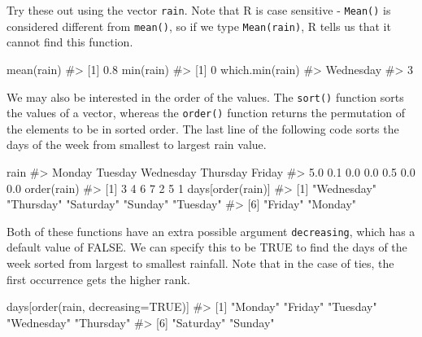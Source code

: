 \documentclass[
  letterpaper,
]{latex/krantz}
\makeatletter
\newenvironment{Shaded}{\begin{snugshade}}{\end{snugshade}}
\newcommand{\AttributeTok}[1]{\textcolor[rgb]{0.40,0.45,0.13}{#1}}
\newcommand{\CommentTok}[1]{\textcolor[rgb]{0.37,0.37,0.37}{#1}}
\newcommand{\ConstantTok}[1]{\textcolor[rgb]{0.56,0.35,0.01}{#1}}
\newcommand{\FunctionTok}[1]{\textcolor[rgb]{0.28,0.35,0.67}{#1}}
\newcommand{\NormalTok}[1]{\textcolor[rgb]{0.00,0.23,0.31}{#1}}
\newenvironment{kframe}{%
\medskip{}
\setlength{\fboxsep}{.8em}
 \def\at@end@of@kframe{}%
 \ifinner\ifhmode%
  \def\at@end@of@kframe{\end{minipage}}%
  \begin{minipage}{\columnwidth}%
 \fi\fi%
 \def\FrameCommand##1{\hskip\@totalleftmargin \hskip-\fboxsep
 \colorbox{shadecolor}{##1}\hskip-\fboxsep
     \hskip-\linewidth \hskip-\@totalleftmargin \hskip\columnwidth}%
 \MakeFramed {\advance\hsize-\width
   \@totalleftmargin\z@ \linewidth\hsize
   \@setminipage}}%
 {\par\unskip\endMakeFramed%
 \at@end@of@kframe}
\renewenvironment{Shaded}{\begin{kframe}}{\end{kframe}}
\makeatother
\begin{document}
Try these out using the vector \texttt{rain}. Note that R is case
sensitive - \texttt{Mean()} is considered different from
\texttt{mean()}, so if we type \texttt{Mean(rain)}, R tells us that it
cannot find this function.

\begin{Shaded}
\begin{Highlighting}[]
\FunctionTok{mean}\NormalTok{(rain)  }
\CommentTok{\#\textgreater{} [1] 0.8}
\FunctionTok{min}\NormalTok{(rain) }
\CommentTok{\#\textgreater{} [1] 0}
\FunctionTok{which.min}\NormalTok{(rain) }
\CommentTok{\#\textgreater{} Wednesday }
\CommentTok{\#\textgreater{}         3}
\end{Highlighting}
\end{Shaded}

We may also be interested in the order of the values. The
\texttt{sort()} function sorts
the values of a vector, whereas the
\texttt{order()} function
returns the permutation of the elements to be in sorted order. The last
line of the following code sorts the days of the week from smallest to
largest rain value.

\begin{Shaded}
\begin{Highlighting}[]
\NormalTok{rain}
\CommentTok{\#\textgreater{}    Monday   Tuesday Wednesday  Thursday    Friday                     }
\CommentTok{\#\textgreater{}       5.0       0.1       0.0       0.0       0.5       0.0       0.0}
\FunctionTok{order}\NormalTok{(rain)}
\CommentTok{\#\textgreater{} [1] 3 4 6 7 2 5 1}
\NormalTok{days[}\FunctionTok{order}\NormalTok{(rain)]}
\CommentTok{\#\textgreater{} [1] "Wednesday" "Thursday"  "Saturday"  "Sunday"    "Tuesday"  }
\CommentTok{\#\textgreater{} [6] "Friday"    "Monday"}
\end{Highlighting}
\end{Shaded}

Both of these functions have an extra possible argument
\texttt{decreasing}, which has a default value of FALSE. We can specify
this to be TRUE to find the days of the week sorted from largest to
smallest rainfall. Note that in the case of ties, the first occurrence
gets the higher rank.

\begin{Shaded}
\begin{Highlighting}[]
\NormalTok{days[}\FunctionTok{order}\NormalTok{(rain, }\AttributeTok{decreasing=}\ConstantTok{TRUE}\NormalTok{)]}
\CommentTok{\#\textgreater{} [1] "Monday"    "Friday"    "Tuesday"   "Wednesday" "Thursday" }
\CommentTok{\#\textgreater{} [6] "Saturday"  "Sunday"}
\end{Highlighting}
\end{Shaded}
\end{document}
